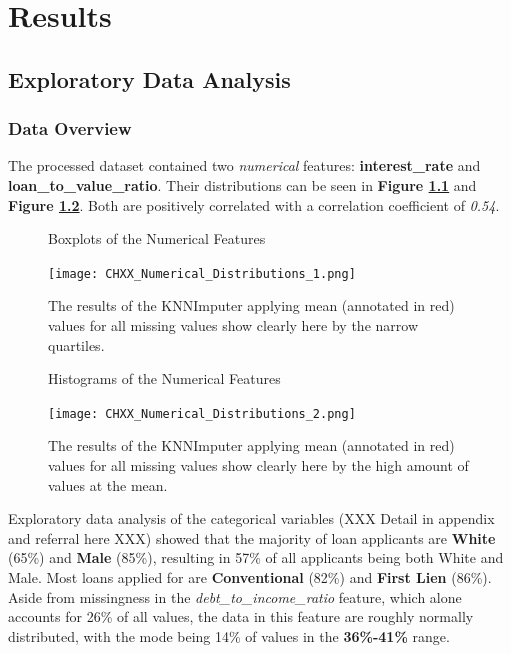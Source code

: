 \chapter{Results}\label{chap:Results}

\section{Exploratory Data Analysis}\label{sec:Exploratory_Data_Analysis}

\subsection{Data Overview}\label{subsec:Data_Overview}

The processed dataset contained two \textit{numerical} features: \textbf{interest\_rate} and \textbf{loan\_to\_value\_ratio}.
Their distributions can be seen in \textbf{Figure \ref{fig:CHXX_Numerical_Distributions_1}} and \textbf{Figure \ref{fig:CHXX_Numerical_Distributions_2}}.
Both are positively correlated with a correlation coefficient of \textit{0.54}. 

\begin{figure}[h]
    \centering
    \caption{Boxplots of the Numerical Features}
    \texttt{[image: CHXX\_Numerical\_Distributions\_1.png]}
    \caption*{The results of the KNNImputer applying mean (annotated in red) values for all missing values show clearly here by the narrow quartiles.}
    \label{fig:CHXX_Numerical_Distributions_1}
\end{figure}

\begin{figure}[h]
    \centering
    \caption{Histograms of the Numerical Features}
    \texttt{[image: CHXX\_Numerical\_Distributions\_2.png]}
    \caption*{The results of the KNNImputer applying mean (annotated in red) values for all missing values show clearly here by the high amount of values at the mean.}
    \label{fig:CHXX_Numerical_Distributions_2}
\end{figure}

Exploratory data analysis of the categorical variables (XXX Detail in appendix and referral here XXX) showed that the majority of loan applicants are \textbf{White} (65\%) and \textbf{Male} (85\%), resulting in 57\% of all applicants being both White and Male.
Most loans applied for are \textbf{Conventional} (82\%) and \textbf{First Lien} (86\%).
Aside from missingness in the \textit{debt\_to\_income\_ratio} feature, which alone accounts for 26\% of all values, the data in this feature are roughly normally distributed, with the mode being 14\% of values in the \textbf{36\%-41\%} range. 


